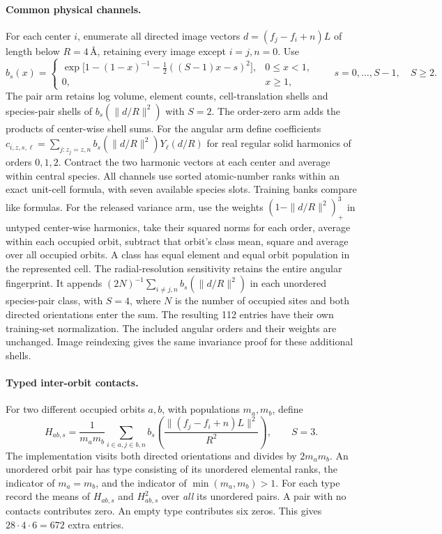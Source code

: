 \paragraph{Common physical channels.}
For each center \(i\), enumerate all directed image vectors \(d=(f_j-f_i+n)L\) of length below
\(R=4\,\text{\AA}\), retaining every image except \(i=j,n=0\). Use
\[
 b_s(x)=\begin{cases}
 \exp\big[1-(1-x)^{-1}-\tfrac12((S-1)x-s)^2\big],&0\leq x<1,\\
 0,&x\geq1 ,
 \end{cases}\qquad s=0,\ldots,S-1,\quad S\geq2.
\]
The pair arm retains log volume, element counts, cell-translation shells and species-pair shells
of \(b_s(\|d/R\|^2)\) with \(S=2\). The order-zero arm adds the products of center-wise shell sums.
For the angular arm define coefficients \(c_{i,z,s,\ell}=\sum_{j:z_j=z,n}
b_s(\|d/R\|^2) Y_\ell(d/R)\) for real regular solid harmonics of orders \(0,1,2\).
Contract the two harmonic vectors at each center and average within central species.
All channels use sorted atomic-number ranks within an exact unit-cell formula, with seven available
species slots. Training banks compare like formulas. For the released variance arm, use the
weights \((1-\|d/R\|^2)_+^3\) in untyped center-wise harmonics, take their squared norms for each
order, average within each occupied orbit, subtract that orbit's class mean, square and average over
all occupied orbits. A class has equal element and equal orbit population in the represented cell.
The radial-resolution sensitivity retains the entire angular fingerprint. It appends
\((2N)^{-1}\sum_{i\ne j,n}b_s(\|d/R\|^2)\) in each unordered species-pair class,
with \(S=4\), where \(N\) is the number of occupied sites and both directed orientations enter
the sum. The resulting 112 entries have their own training-set normalization. The included
angular orders and their weights are unchanged. Image reindexing gives the same invariance
proof for these additional shells.

\paragraph{Typed inter-orbit contacts.}
For two different occupied orbits \(a,b\), with populations \(m_a,m_b\), define
\[
 H_{ab,s}=\frac{1}{m_am_b}\sum_{i\in a,j\in b,n}
 b_s\!\left(\frac{\|(f_j-f_i+n)L\|^2}{R^2}\right),\qquad S=3.
\]
The implementation visits both directed orientations and divides by \(2m_am_b\).
An unordered orbit pair has type consisting of its unordered elemental ranks, the indicator of
\(m_a=m_b\), and the indicator of \(\min(m_a,m_b)>1\). For each type record the means of \(H_{ab,s}\)
and \(H_{ab,s}^2\) over \emph{all} its unordered pairs. A pair with no contacts contributes zero.
An empty type contributes six zeros. This gives \(28\cdot4\cdot6=672\) extra entries.

